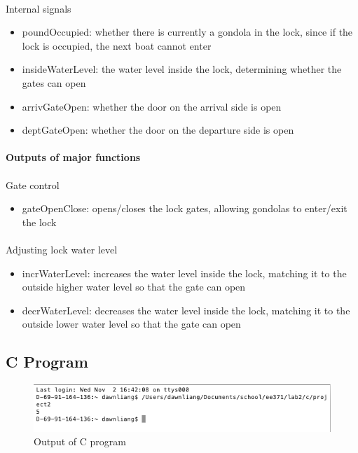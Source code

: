 \documentclass{article}
\begin{document}
      \paragraph{} Internal signals
      \begin{itemize}
        \item poundOccupied: whether there is currently a gondola in the lock, since if the lock is occupied, the next boat cannot enter
        \item insideWaterLevel: the water level inside the lock, determining whether the gates can open
        \item arrivGateOpen: whether the door on the arrival side is open
        \item deptGateOpen: whether the door on the departure side is open
      \end{itemize}

      \paragraph{Outputs of major functions}
      \paragraph{} Gate control
      \begin{itemize}
        \item gateOpenClose: opens/closes the lock gates, allowing gondolas to enter/exit the lock
      \end{itemize}

      \paragraph{} Adjusting lock water level
      \begin{itemize}
        \item incrWaterLevel: increases the water level inside the lock, matching it to the outside higher water level so that the gate can open
        \item decrWaterLevel: decreases the water level inside the lock, matching it to the outside lower water level so that the gate can open
      \end{itemize}

	\subsection{C Program}
    

    \begin{figure}[H]
      \centering
      \includegraphics[width=0.75\linewidth]{figures/c/c_output.png}
      \caption{Output of C program}
      \label{fig:c_output}
    \end{figure}
\end{document}

